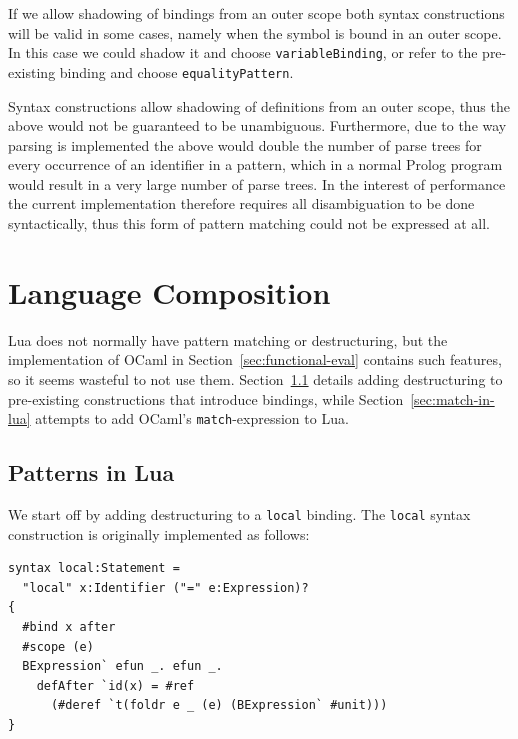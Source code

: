 \documentclass{kththesis}
\begin{document}
If we allow shadowing of bindings from an outer scope both syntax constructions will be valid in some cases, namely when the symbol is bound in an outer scope. In this case we could shadow it and choose \texttt{variableBinding}, or refer to the pre-existing binding and choose \texttt{equalityPattern}.

Syntax constructions allow shadowing of definitions from an outer scope, thus the above would not be guaranteed to be unambiguous. Furthermore, due to the way parsing is implemented the above would double the number of parse trees for every occurrence of an identifier in a pattern, which in a normal Prolog program would result in a very large number of parse trees. In the interest of performance the current implementation therefore requires all disambiguation to be done syntactically, thus this form of pattern matching could not be expressed at all.



\section{Language Composition} \label{sec:language-composition}

Lua does not normally have pattern matching or destructuring, but the implementation of OCaml in Section~\ref{sec:functional-eval} contains such features, so it seems wasteful to not use them. Section~\ref{sec:patterns-in-lua} details adding destructuring to pre-existing constructions that introduce bindings, while Section~\ref{sec:match-in-lua} attempts to add OCaml's \texttt{match}-expression to Lua.

\subsection{Patterns in Lua} \label{sec:patterns-in-lua}

We start off by adding destructuring to a \texttt{local} binding. The \texttt{local} syntax construction is originally implemented as follows:

\begin{verbatim}
syntax local:Statement =
  "local" x:Identifier ("=" e:Expression)?
{
  #bind x after
  #scope (e)
  BExpression` efun _. efun _.
    defAfter `id(x) = #ref
      (#deref `t(foldr e _ (e) (BExpression` #unit)))
}
\end{verbatim}
\end{document}
